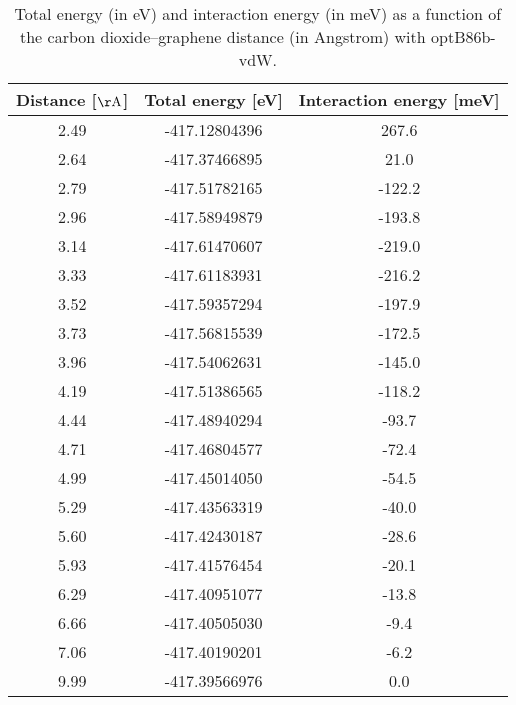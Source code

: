 \begin{table}[h]
\centering
\begin{tabular}{ccc}
\hline
Distance [$\mathrm{\AA}$] & Total energy [eV] & Interaction energy [meV] \\
\hline
2.49 & -417.12804396 & 267.6 \\
2.64 & -417.37466895 & 21.0 \\
2.79 & -417.51782165 & -122.2 \\
2.96 & -417.58949879 & -193.8 \\
3.14 & -417.61470607 & -219.0 \\
3.33 & -417.61183931 & -216.2 \\
3.52 & -417.59357294 & -197.9 \\
3.73 & -417.56815539 & -172.5 \\
3.96 & -417.54062631 & -145.0 \\
4.19 & -417.51386565 & -118.2 \\
4.44 & -417.48940294 & -93.7 \\
4.71 & -417.46804577 & -72.4 \\
4.99 & -417.45014050 & -54.5 \\
5.29 & -417.43563319 & -40.0 \\
5.60 & -417.42430187 & -28.6 \\
5.93 & -417.41576454 & -20.1 \\
6.29 & -417.40951077 & -13.8 \\
6.66 & -417.40505030 & -9.4 \\
7.06 & -417.40190201 & -6.2 \\
9.99 & -417.39566976 & 0.0 \\
\hline
\end{tabular}
\caption{Total energy (in eV) and interaction energy (in meV) as a function of the carbon dioxide--graphene distance (in Angstrom) with optB86b-vdW.}
\label{SI_dft_table_optB86b-vdW}
\end{table}